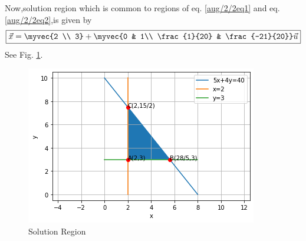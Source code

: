 Now,solution region which is common to regions of eq. \eqref{aug/2/2eq1} and eq. \eqref{aug/2/2eq2},is given by
\begin{align}
    \boxed{\vec{x} = \myvec{2 \\ 3}+\myvec{0 & 1\\ \frac{1}{20} & \frac{-21}{20}}\vec{u}}
\end{align}
See Fig. \ref{aug/2/2fig:fig1}.
%
\begin{figure}[!ht]
\centering
\includegraphics[width=\columnwidth]{solutions/aug/2/2/Figures/Figure1.png}
\caption{Solution Region}
\label{aug/2/2fig:fig1}	
\end{figure}

